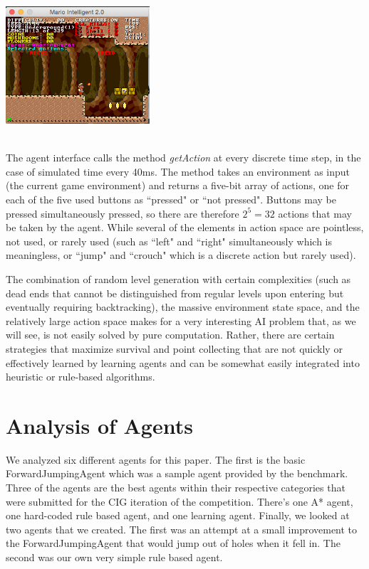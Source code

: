 \documentclass[12pt]{article}
\begin{document}
\begin{multicols}{2}
\begingroup
    \centering
    \includegraphics[width=0.4\textwidth]{Fire}
\endgroup

\hspace{5mm}
\\
\indent The agent interface calls the method \textit{getAction} at every discrete time step, in the case of simulated time every 40ms. 
The method takes an environment as input (the current game environment) and returns a  five-bit array of actions, one for each of the 
five used buttons as ``pressed" or ``not pressed". Buttons may be pressed simultaneously pressed, so there are therefore \(2^5 = 32\) 
actions that may be taken by the agent. While several of the elements in action space are pointless, not used, or rarely used (such as 
``left" and ``right" simultaneously which is meaningless, or ``jump" and ``crouch" which is a discrete action but rarely used). 

The combination of random level generation with certain complexities (such as dead ends that cannot be distinguished from regular levels upon 
entering but eventually requiring backtracking), the massive environment state space, and the relatively large action space makes for a very interesting 
AI problem that, as we will see, is not easily solved by pure computation. Rather, there are certain strategies that maximize survival and point collecting that are not
 quickly or effectively learned by learning agents and can be somewhat easily integrated into heuristic or rule-based algorithms.
 
\section * {Analysis of Agents}
We analyzed six different agents for this paper.  The first is the basic ForwardJumpingAgent which 
was a sample agent provided by the benchmark.  Three of the agents are the best agents within
their respective categories that were submitted 
for the CIG iteration of the competition.  There's one A* agent, one hard-coded rule based agent, and 
one learning agent.  Finally, we looked at two agents that we created.  The first was an attempt at a 
small improvement to the ForwardJumpingAgent that would jump out of holes when it fell in.  
The second was our own very simple rule based agent.


\end{multicols}
\end{document}
